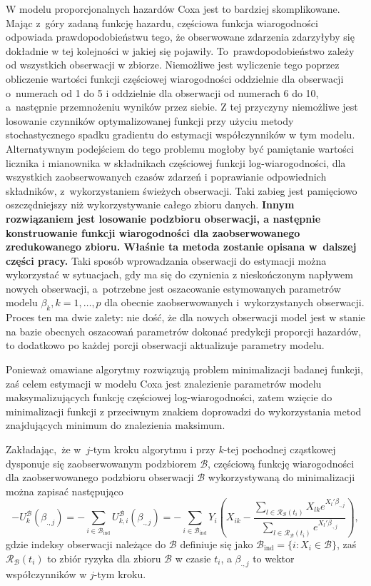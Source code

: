 W modelu proporcjonalnych hazardów Coxa jest to bardziej skomplikowane. Mając z~góry zadaną funkcję hazardu, częściowa funkcja wiarogodności odpowiada prawdopodobieństwu tego, że obserwowane zdarzenia zdarzyłyby się dokładnie w tej kolejności w jakiej się pojawiły. To~prawdopodobieństwo zależy od wszystkich obserwacji w zbiorze. Niemożliwe jest wyliczenie tego poprzez obliczenie wartości funkcji częściowej wiarogodności oddzielnie dla obserwacji o~numerach od 1 do 5 i oddzielnie dla obserwacji od numerach 6 do 10, a~następnie przemnożeniu wyników przez siebie. Z tej przyczyny niemożliwe jest losowanie czynników optymalizowanej funkcji przy użyciu metody stochastycznego spadku gradientu do estymacji współczynników w tym modelu. Alternatywnym podejściem do tego problemu mogłoby być pamiętanie wartości licznika i mianownika w składnikach częściowej funkcji log-wiarogodności, dla wszystkich zaobserwowanych czasów zdarzeń i poprawianie odpowiednich składników, z~wykorzystaniem świeżych obserwacji. Taki zabieg jest pamięciowo oszczędniejszy niż wykorzystywanie całego zbioru danych. \textbf{Innym rozwiązaniem jest losowanie podzbioru obserwacji, a następnie konstruowanie funkcji wiarogodności dla zaobserwowanego zredukowanego zbioru. Właśnie ta metoda zostanie opisana w~dalszej części pracy.} Taki sposób wprowadzania obserwacji do estymacji można wykorzystać w sytuacjach, gdy ma się do czynienia z nieskończonym napływem nowych obserwacji, a~potrzebne jest oszacowanie estymowanych parametrów modelu $\beta_k, k=1,\dots,p$ dla obecnie zaobserwowanych i~wykorzystanych obserwacji. Proces ten ma dwie zalety: nie dość, że dla nowych obserwacji model jest w stanie na bazie obecnych oszacowań parametrów dokonać predykcji proporcji hazardów, to dodatkowo po każdej porcji obserwacji aktualizuje parametry modelu.

Ponieważ
omawiane algorytmy rozwiązują problem minimalizacji badanej funkcji, zaś
celem estymacji w modelu Coxa jest znalezienie parametrów modelu
maksymalizujących funkcję częściowej log-wiarogodności, zatem wzięcie do
minimalizacji funkcji z przeciwnym znakiem doprowadzi do wykorzystania
metod znajdujących minimum do znalezienia maksimum. 

Zakładając,~że w~\(j\)-tym kroku
algorytmu i przy \(k\)-tej pochodnej cząstkowej dysponuje się zaobserwowanym podzbiorem
\(\mathcal{B}\), częściową funkcję wiarogodności dla zaobserwowanego podzbioru obserwacji \(\mathcal{B}\) wykorzystywaną do minimalizacji można zapisać następująco
\begin{equation}
-U^\mathcal{B}_k(\beta_{.,j})=-\sum\limits_{i \in \mathcal{B}_\text{ind}}^{}U^\mathcal{B}_{k,i}(\beta_{.,j})=-\sum\limits_{i \in \mathcal{B}_\text{ind}}^{}Y_i\left(X_{ik}-\dfrac{\sum\limits_{l\in \mathscr{R}_\mathcal{B}(t_i)}^{} X_{lk} e^{X_l'\beta_{.,j}}}{\sum\limits_{l\in \mathscr{R}_\mathcal{B}(t_i)}^{} e^{X_l'\beta_{.,j}}}\right),
\end{equation}
gdzie indeksy obserwacji należące do \(\mathcal{B}\) definiuje się jako
\(\mathcal{B}_{\text{ind}} = \{i: X_i \in \mathcal{B} \}\), zaś
\(\mathscr{R}_\mathcal{B}(t_i)\) to zbiór ryzyka dla zbioru
\(\mathcal{B}\) w czasie \(t_i\), a $\beta_{.,j}$ to wektor współczynników w $j$-tym kroku.

